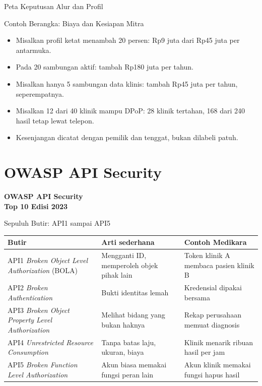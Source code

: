 \documentclass[aspectratio=169, table, 12pt]{beamer}
\begin{document}
\begin{frame}{{\Large Peta Keputusan Alur dan Profil}}
  \centering
\end{frame}

\begin{frame}{{\Large Contoh Berangka: Biaya dan Kesiapan Mitra}}
  \vspace{10pt}
  \begin{itemize}
    \item Misalkan profil ketat menambah 20 persen: Rp9 juta dari Rp45 juta per antarmuka.
    \item Pada 20 sambungan aktif: tambah Rp180 juta per tahun.
    \item Misalkan hanya 5 sambungan data klinis: tambah Rp45 juta per tahun, seperempatnya.
    \item Misalkan 12 dari 40 klinik mampu DPoP: 28 klinik tertahan, 168 dari 240 hasil tetap lewat telepon.
    \item Kesenjangan dicatat dengan pemilik dan tenggat, bukan dilabeli patuh.
  \end{itemize}
\end{frame}

\section{OWASP API Security}

\begin{frame}{\hfill}
  \centering
  \Huge{\textbf{OWASP API Security\\Top 10 Edisi 2023}}
\end{frame}

\begin{frame}{{\Large Sepuluh Butir: API1 sampai API5}}
  \footnotesize
  \begin{tabularx}{\textwidth}{>{\raggedright\arraybackslash}p{4.3cm}
      >{\raggedright\arraybackslash}X >{\raggedright\arraybackslash}X}
    \hline
    \textbf{Butir} & \textbf{Arti sederhana} & \textbf{Contoh Medikara} \\ \hline
    API1 \textit{Broken Object Level Authorization} (BOLA) & Mengganti ID, memperoleh objek pihak lain & Token klinik A membaca pasien klinik B \\ \hline
    API2 \textit{Broken Authentication} & Bukti identitas lemah & Kredensial dipakai bersama \\ \hline
    API3 \textit{Broken Object Property Level Authorization} & Melihat bidang yang bukan haknya & Rekap perusahaan memuat diagnosis \\ \hline
    API4 \textit{Unrestricted Resource Consumption} & Tanpa batas laju, ukuran, biaya & Klinik menarik ribuan hasil per jam \\ \hline
    API5 \textit{Broken Function Level Authorization} & Akun biasa memakai fungsi peran lain & Akun klinik memakai fungsi hapus hasil \\ \hline
  \end{tabularx}
\end{frame}
\end{document}
